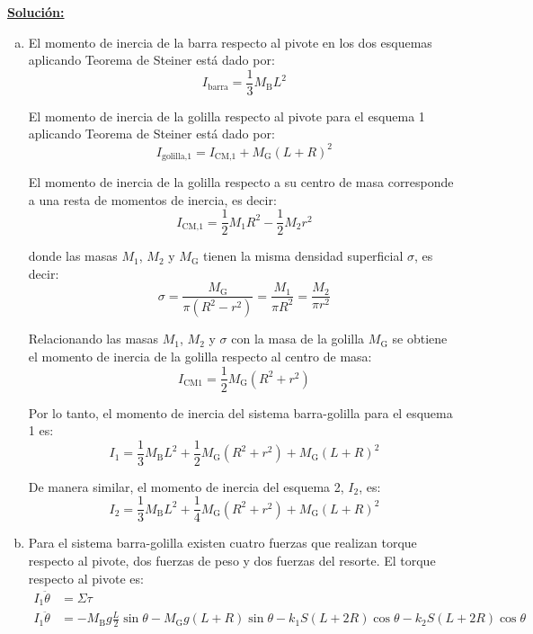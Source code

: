 \textbf{\underline{Soluci\'on:}}

\begin{enumerate}[a)]

\item
	El momento de inercia de la barra respecto al pivote en los dos esquemas aplicando Teorema de Steiner est\'a dado por:
	\begin{equation*}
	I_\text{barra} =\frac{1}{3}M_{\text{B}}L^2
	\end{equation*}
	
	El momento de inercia de la golilla respecto al pivote para el esquema 1 aplicando Teorema de Steiner est\'a dado por:
	\begin{equation*}
	I_\text{golilla,1} = I_\text{CM,1} + M_{\text{G}}{(L+R)}^2
	\end{equation*}
	
	El momento de inercia de la golilla respecto a su centro de masa corresponde a una resta de momentos de inercia, es decir:
	\begin{equation*}
	I_{\text{CM,1}}=\frac{1}{2}M_1R^2-\frac{1}{2}M_2r^2
	\end{equation*}
	
	\noindent donde las masas $M_1$, $M_2$ y $M_\text{G}$ tienen la misma densidad superficial $\sigma$, es decir:
	\begin{equation*}
		\sigma=\frac{M_{\text{G}}}{\pi(R^2-r^2)} = \frac{M_1}{\pi R^2} =\frac{M_2}{\pi r^2}
	\end{equation*}

	Relacionando las masas $M_1$, $M_2$ y $\sigma$ con la masa de la golilla $M_\text{G}$ se obtiene el momento de inercia de la golilla respecto al centro de masa:
	\begin{equation*}
	I_{\text{CM}1}=\frac{1}{2}M_{\text{G}}(R^2+r^2)
	\end{equation*}
	
	Por lo tanto, el momento de inercia del sistema barra-golilla para el esquema 1 es:
	\begin{equation*}
		I_1=\frac{1}{3}M_{\text{B}}L^2 + \frac{1}{2}M_{\text{G}}(R^2+r^2) + M_{\text{G}}{(L+R)}^2
	\end{equation*}
	
	De manera similar, el momento de inercia del esquema 2, $I_2$, es:
	\begin{equation*}
	I_2=\frac{1}{3}M_{\text{B}}L^2 + \frac{1}{4}M_{\text{G}}(R^2+r^2) + M_{\text{G}}{(L+R)}^2
	\end{equation*}
\item
	Para el sistema barra-golilla existen cuatro fuerzas que realizan torque respecto al pivote, dos fuerzas de peso y dos fuerzas del resorte. El torque respecto al pivote es:
	\begin{align*}
		I_1 \ddot\theta &= \Sigma \tau \\
		I_1\ddot\theta &= -M_{\text{B}} g  \frac{L}{2}\sin\theta - M_{\text{G}}g(L+R)\sin\theta - k_1S(L+2R)\cos\theta - k_2S(L+2R)\cos\theta
	\end{align*}
	

\end{enumerate}
